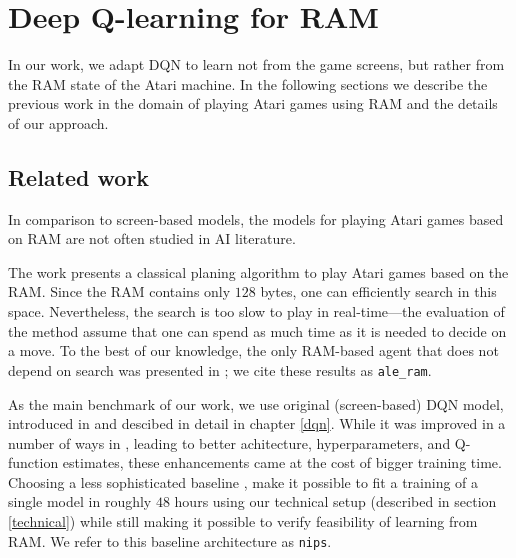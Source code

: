 \chapter{Deep Q-learning for RAM}\label{dqn-ram}
In our work, we adapt DQN to learn not from the game screens, but rather from the RAM state of the Atari machine. In the following sections we describe the previous work in the domain of playing Atari games using RAM and the details of our approach.

\section{Related work}
In comparison to screen-based models, the models for playing Atari games based on RAM are not often studied in AI literature.

The work \cite{nir} presents a classical planing algorithm to play Atari games based on the RAM. Since the RAM contains only $128$ bytes, one can efficiently search in this space. Nevertheless, the search is too slow to play in real-time---the evaluation of the method assume that one can spend as much time as it is needed to decide on a move. To the best of our knowledge, the only RAM-based agent that does not depend on search was presented in \cite{ale}; we cite these results as \texttt{ale\_ram}.

As the main benchmark of our work, we use original (screen-based) DQN model, introduced in \cite{nips-dqn} and descibed in detail in chapter \ref{dqn}. While it was improved in a number of ways in \cite{nature-dqn, double-dqn, shallow-dqn, duelling-dqn}, leading to better achitecture, hyperparameters, and Q-function estimates, these enhancements came at the cost of bigger training time. Choosing a less sophisticated baseline \cite{nips-dqn}, make it possible to fit a training of a single model in roughly $48$ hours using our technical setup (described in section \ref{technical}) while still making it possible to verify feasibility of learning from RAM. We refer to this baseline architecture as \texttt{nips}.

